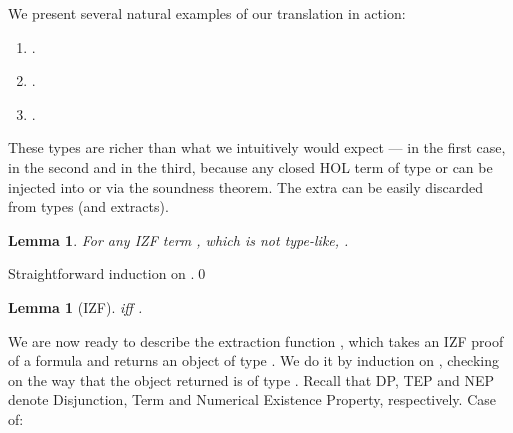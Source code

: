 \documentclass{LMCS}
\newtheorem{lemma}[thm]{Lemma}
\begin{document}
We present several natural examples of our translation in action:
\begin{enumerate}[(1)]
\item .
\item .
\item . 
\end{enumerate}

These types are richer than what we intuitively would expect ---  in
the first case,  in the second and  in
the third, because any closed HOL term of type  or  can be
injected into  or  via the soundness theorem. The extra  can be easily
discarded from types (and extracts).

\begin{lemma}\label{ovsubst}
For any IZF term , which is not type-like, . 
\end{lemma}
\proof
Straightforward induction on .\qed


\begin{lemma}[IZF]\label{l2}
 iff . 
\end{lemma}

We are now ready to describe the extraction function , which takes an IZF
proof  of a
formula  and returns an object of  type . We do it by
induction on , checking on the way that the object returned is
of type . Recall that DP, TEP and NEP denote Disjunction, Term
and Numerical Existence Property, respectively. Case  of:
\end{document}
